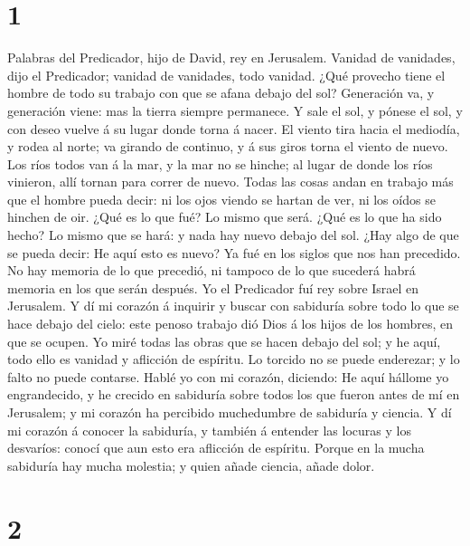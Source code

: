 \hypertarget{section}{%
\section{1}\label{section}}

 Palabras del Predicador, hijo de David, rey en Jerusalem.
 Vanidad de vanidades, dijo el Predicador; vanidad de
vanidades, todo vanidad.  ¿Qué provecho tiene el hombre de
todo su trabajo con que se afana debajo del sol? 
Generación va, y generación viene: mas la tierra siempre permanece.
 Y sale el sol, y pónese el sol, y con deseo vuelve á su
lugar donde torna á nacer.  El viento tira hacia el
mediodía, y rodea al norte; va girando de continuo, y á sus giros torna
el viento de nuevo.  Los ríos todos van á la mar, y la mar
no se hinche; al lugar de donde los ríos vinieron, allí tornan para
correr de nuevo.  Todas las cosas andan en trabajo más que
el hombre pueda decir: ni los ojos viendo se hartan de ver, ni los oídos
se hinchen de oir.  ¿Qué es lo que fué? Lo mismo que será.
¿Qué es lo que ha sido hecho? Lo mismo que se hará: y nada hay nuevo
debajo del sol.  ¿Hay algo de que se pueda decir: He aquí
esto es nuevo? Ya fué en los siglos que nos han precedido.
 No hay memoria de lo que precedió, ni tampoco de lo que
sucederá habrá memoria en los que serán después.  Yo el
Predicador fuí rey sobre Israel en Jerusalem.  Y dí mi
corazón á inquirir y buscar con sabiduría sobre todo lo que se hace
debajo del cielo: este penoso trabajo dió Dios á los hijos de los
hombres, en que se ocupen.  Yo miré todas las obras que
se hacen debajo del sol; y he aquí, todo ello es vanidad y aflicción de
espíritu.  Lo torcido no se puede enderezar; y lo falto
no puede contarse.  Hablé yo con mi corazón, diciendo: He
aquí hállome yo engrandecido, y he crecido en sabiduría sobre todos los
que fueron antes de mí en Jerusalem; y mi corazón ha percibido
muchedumbre de sabiduría y ciencia.  Y dí mi corazón á
conocer la sabiduría, y también á entender las locuras y los desvaríos:
conocí que aun esto era aflicción de espíritu.  Porque en
la mucha sabiduría hay mucha molestia; y quien añade ciencia, añade
dolor.

\hypertarget{section-1}{%
\section{2}\label{section-1}}

